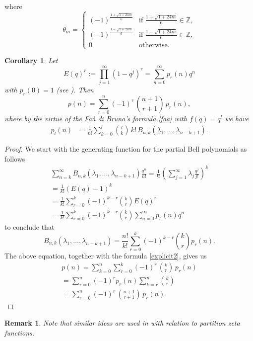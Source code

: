\documentclass{amsart}
\theoremstyle{plain}
\newtheorem{remark}{Remark}
\newtheorem{corollary}{Corollary}
\theoremstyle{definition}
\begin{document}
where
\begin{equation*}
\theta_{m}=
\begin{cases}
(-1)^{\frac{1+\sqrt{1+24m}}{6}} & \text{if $\frac{1+\sqrt{1+24m}}{6}\in \mathbb{Z},$}\\
(-1)^{\frac{1-\sqrt{1+24m}}{6}} & \text{if $\frac{1-\sqrt{1+24m}}{6}\in \mathbb{Z},$}\\
0 & \text{otherwise.}
\end{cases}
\end{equation*}
\begin{corollary}
Let $$E(q)^{r}:=\prod_{j=1}^{\infty}(1-q^{j})^{r}=\sum_{n=0}^{\infty}p_{r}(n)q^{n}$$ with $p_{r}(0)=1$ (see \cite{Atkin}). Then
$$
p(n)=\sum_{r=0}^{n}(-1)^{r}\,\binom{n+1}{r+1}\,p_{r}(n),
$$
where by the virtue of the Fa\`{a} di Bruno's formula \eqref{faa} with $f(q)=q^{l}$ we have
\begin{eqnarray*}
p_{l}(n)&=\frac{1}{n!}\sum_{k=0}^{l}\binom{l}{k}\,k!\, B_{n,k}(\lambda_{1},\ldots ,\lambda_{n-k+1}).
\end{eqnarray*}
\end{corollary} 
\begin{proof}
We start with the generating function for the partial Bell polynomials \cite[Equation (3a') on p. 133]{Comtet} as follows
\begin{eqnarray*}
{\displaystyle \sum _{n=k}^{\infty }B_{n,k}(\lambda_{1},\ldots ,\lambda_{n-k+1}){\frac {q^{n}}{n!}}}
= {\frac {1}{k!}}\left(\sum _{j=1}^{\infty }\lambda_{j}{\frac {q^{j}}{j!}}\right)^{k} \\
=\frac{1}{k!}(E(q)-1)^{k}\\
=\frac{1}{k!}\sum_{r=0}^{k}(-1)^{k-r}\binom{k}{r}E(q)^{r}\\
=\frac{1}{k!}\sum_{r=0}^{k}(-1)^{k-r}\binom{k}{r}\sum_{n=0}^{\infty}p_{r}(n)q^{n}
\end{eqnarray*}
to conclude that
$$
B_{n,k}(\lambda_{1},\ldots ,\lambda_{n-k+1})=\frac{n!}{k!}\sum_{r=0}^{k}(-1)^{k-r}\binom{k}{r}p_{r}(n).
$$
The above equation, together with the formula \eqref{explicit2}, gives us
\begin{eqnarray*}
p(n)=\sum_{k=0}^{n}\sum_{r=0}^{k}(-1)^{r}\, \binom{k}{r}\,p_{r}(n)\\
=\sum_{r=0}^{n}(-1)^{r}p_{r}(n)\sum_{k=r}^{n}\binom{k}{r}\\
=\sum_{r=0}^{n}(-1)^{r}\,\binom{n+1}{r+1}\,p_{r}(n).
\end{eqnarray*}
\end{proof}
\begin{remark}
Note that similar ideas are used in \cite{Ono-etc} with relation to partition zeta functions.
\end{remark}
\end{document}
